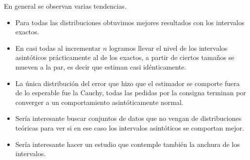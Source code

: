 \documentclass[]{article}
\providecommand{\tightlist}{%
  \setlength{\itemsep}{0pt}\setlength{\parskip}{0pt}}
\begin{document}
En general se observan varias tendencias.

\begin{itemize}
\tightlist
\item
  Para todas las distribuciones obtuvimos mejores resultados con los
  intervalos exactos.
\item
  En casi todas al incrementar \(n\) logramos llevar el nivel de los
  intervalos asintóticos prácticamente al de los exactos, a partir de
  ciertos tamaños se mueven a la par, es decir que estiman casi
  idénticamente.
\item
  La única distribución del error que hizo que el estimador se comporte
  fuera de lo esperable fue la Cauchy, todas las pedidas por la consigna
  terminan por converger a un comportamiento asintóticamente normal.
\item
  Sería interesante buscar conjuntos de datos que no vengan de
  distribuciones teóricas para ver si en ese caso los intervalos
  asintóticos se comportan mejor.
\item
  Sería interesante hacer un estudio que contemple también la anchura de
  los intervalos.
\end{itemize}
\end{document}
